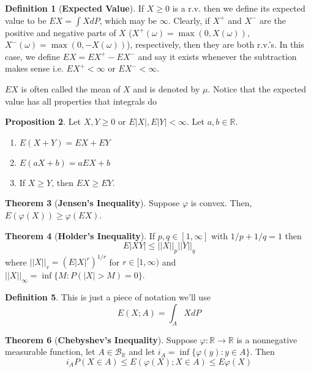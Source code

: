\documentclass{article}
\theoremstyle{definition}
\newtheorem{theorem}{Theorem}[section]
\newtheorem{proposition}[theorem]{Proposition}
\newtheorem{definition}[theorem]{Definition}
\begin{document}
\begin{definition}[\textbf{Expected Value}]
    If $X \geq 0$ is a r.v. then we define its expected value to be $EX = \int X dP$, which may be $\infty$. Clearly, if $X^+$ and $X^-$ are the positive and negative parts of $X$ ($X^+(\omega) = \max(0, X(\omega))$, $X^-(\omega) = \max(0, - X(\omega))$), respectively, then they are both r.v.'s. In this case, we define $EX = E X^+ - E X^-$ and say it exists whenever the subtraction makes sense i.e. $EX^+ < \infty$ or $EX^- < \infty$.
\end{definition}

$EX$ is often called the mean of $X$ and is denoted by $\mu$. Notice that the expected value has all properties that integrals do

\begin{proposition}
    Let $X, Y \geq 0$ or $E|X|, E|Y| < \infty$. Let $a, b \in \mathbb{R}$.
    \begin{enumerate}
        \item $E(X+Y)=EX+EY$
        \item $E(aX+b) = aEX + b$
        \item If $X \geq Y$, then $EX \geq EY$.
    \end{enumerate}
\end{proposition}

\begin{theorem}[\textbf{Jensen's Inequality}]
    Suppose $\varphi$ is convex. Then, $E(\varphi(X)) \geq \varphi(EX)$.
\end{theorem}

\begin{theorem}[\textbf{Holder's Inequality}]
    If $p, q \in [1, \infty]$ with $1/p + 1/q = 1$ then
    $$ E|XY| \leq ||X||_p ||Y||_q$$
    where $||X||_r = (E|X|^r)^{1/r}$ for $r \in [1, \infty)$ and $||X||_\infty = \inf \{ M : P(|X| > M) = 0 \}$.
\end{theorem}

\begin{definition}
    This is just a piece of notation we'll use
    $$ E(X; A) = \int_A X dP$$
\end{definition}

\begin{theorem}[\textbf{Chebyshev's Inequality}]
    Suppose $\varphi : \mathbb{R} \to \mathbb{R}$ is a nonnegative measurable function, let $A \in \mathcal{B}_{\mathbb{R}}$ and let $i_A = \inf \{ \varphi(y) : y \in A \}$. Then
    $$ i_AP(X \in A) \leq E(\varphi(X); X \in A) \leq E \varphi(X)$$
\end{theorem}
\end{document}
